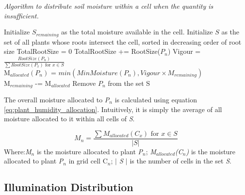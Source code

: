 \begin{algorithm}
\caption{\textit{Algorithm to distribute soil moisture within a cell when the quantity is insufficient.}}
\begin{algorithmic}[1]
\REQUIRE Initialize $S_{remaining}$ as the total moisture available in the cell.
\REQUIRE Initialize $S$ as the set of all plants whose roots intersect the cell, sorted in decreasing order of root size
\STATE TotalRootSize = 0
	\STATE TotalRootSize += RootSize($P_{n}$)
\ENDFOR
{}
	\STATE Vigour = $\frac{RootSize(P_{n})}{\sum RootSize(P_{x}) \text{ for } x \in S}$\\
	\STATE M$_{allocated}(P_{n})$ = $min(MinMoisture(P_{n}), Vigour \times M_{remaining})$ \\
	\STATE M$_{remaining}$ -= M$_{allocated}$
	\STATE Remove $P_{n}$ from the set S
\ENDFOR
\end{algorithmic}
\label{alg:humidity_allocation_insufficient_calc}
\end{algorithm}

The overall moisture allocated to \textit{P$_{n}$} is calculated using equation \ref{eq:plant_humidity_allocation}. Intuitively, it is simply the average of all moisture allocated to it within all cells of \textit{S}.

\begin{equation}
M_{n} = \frac{\sum M_{allocated}(C_{x}) \text{ for } x \in S}{| S |}
\label{eq:plant_humidity_allocation}
\end{equation}
Where:\textit{M$_{n}$} is the moisture allocated to plant \textit{P$_{n}$}; \textit{M$_{allocated}$(C$_{n}$)} is the moisture allocated to plant \textit{P$_{n}$} in grid cell C$_{n}$; \textit{$|$ S $|$} is the number of cells in the set \textit{S}.\\

\subsection{Illumination Distribution}

